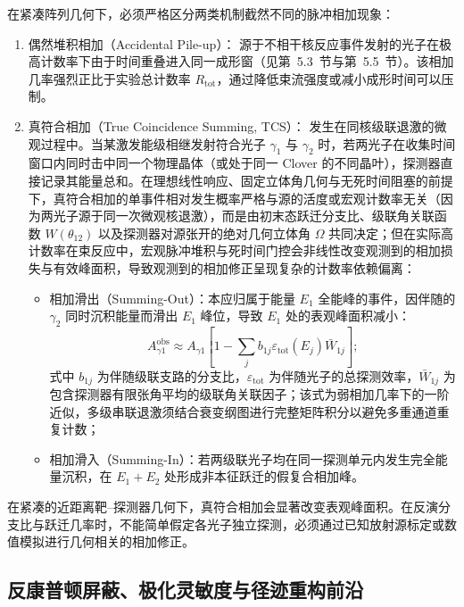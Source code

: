 在紧凑阵列几何下，必须严格区分两类机制截然不同的脉冲相加现象：
\begin{enumerate}
\item 偶然堆积相加（Accidental Pile-up）：
源于不相干核反应事件发射的光子在极高计数率下由于时间重叠进入同一成形窗（见第~5.3~节与第~5.5~节）。该相加几率强烈正比于实验总计数率 $R_{\mathrm{tot}}$，通过降低束流强度或减小成形时间可以压制。
\item 真符合相加（True Coincidence Summing, TCS）：
发生在同核级联退激的微观过程中。当某激发能级相继发射符合光子 $\gamma_1$ 与 $\gamma_2$ 时，若两光子在收集时间窗口内同时击中同一个物理晶体（或处于同一 Clover 的不同晶叶），探测器直接记录其能量总和。在理想线性响应、固定立体角几何与无死时间阻塞的前提下，真符合相加的单事件相对发生概率严格与源的活度或宏观计数率无关（因为两光子源于同一次微观核退激），而是由初末态跃迁分支比、级联角关联函数 $W(\theta_{12})$ 以及探测器对源张开的绝对几何立体角 $\Omega$ 共同决定；但在实际高计数率在束反应中，宏观脉冲堆积与死时间门控会非线性改变观测到的相加损失与有效峰面积，导致观测到的相加修正呈现复杂的计数率依赖偏离：
\begin{itemize}
\item 相加滑出（Summing-Out）：本应归属于能量 $E_1$ 全能峰的事件，因伴随的 $\gamma_2$ 同时沉积能量而滑出 $E_1$ 峰位，导致 $E_1$ 处的表观峰面积减小：
\begin{equation}\label{eq:5-2-summing-out}
A_{\gamma 1}^{\mathrm{obs}} \approx A_{\gamma 1} \left[ 1 - \sum_j b_{1j} \varepsilon_{\mathrm{tot}}(E_j) \bar{W}_{1j} \right];
\end{equation}
式中 $b_{1j}$ 为伴随级联支路的分支比，$\varepsilon_{\mathrm{tot}}$ 为伴随光子的总探测效率，$\bar{W}_{1j}$ 为包含探测器有限张角平均的级联角关联因子；该式为弱相加几率下的一阶近似，多级串联退激须结合衰变纲图进行完整矩阵积分以避免多重通道重复计数；
\item 相加滑入（Summing-In）：若两级联光子均在同一探测单元内发生完全能量沉积，在 $E_1 + E_2$ 处形成非本征跃迁的假复合相加峰。
\end{itemize}
\end{enumerate}
在紧凑的近距离靶--探测器几何下，真符合相加会显著改变表观峰面积。在反演分支比与跃迁几率时，不能简单假定各光子独立探测，必须通过已知放射源标定或数值模拟进行几何相关的相加修正。

\subsection{反康普顿屏蔽、极化灵敏度与径迹重构前沿}\label{subsec:5-2-5}


